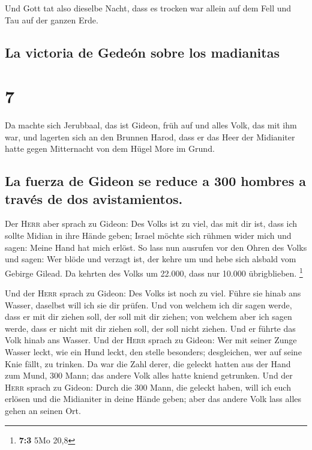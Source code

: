  Und Gott tat also dieselbe Nacht, dass es trocken war
allein auf dem Fell und Tau auf der ganzen Erde.

\hypertarget{la-victoria-de-gedeuxf3n-sobre-los-madianitas}{%
\subsection{La victoria de Gedeón sobre los
madianitas}\label{la-victoria-de-gedeuxf3n-sobre-los-madianitas}}

\hypertarget{section-6}{%
\section{7}\label{section-6}}

 Da machte sich Jerubbaal, das ist Gideon, früh auf und
alles Volk, das mit ihm war, und lagerten sich an den Brunnen Harod,
dass er das Heer der Midianiter hatte gegen Mitternacht von dem Hügel
More im Grund.

\hypertarget{la-fuerza-de-gideon-se-reduce-a-300-hombres-a-travuxe9s-de-dos-avistamientos.}{%
\subsection{La fuerza de Gideon se reduce a 300 hombres a través de dos
avistamientos.}\label{la-fuerza-de-gideon-se-reduce-a-300-hombres-a-travuxe9s-de-dos-avistamientos.}}

 Der \textsc{Herr} aber sprach zu Gideon: Des Volks ist zu
viel, das mit dir ist, dass ich sollte Midian in ihre Hände geben;
Israel möchte sich rühmen wider mich und sagen: Meine Hand hat mich
erlöst.  So lass nun ausrufen vor den Ohren des Volks und
sagen: Wer blöde und verzagt ist, der kehre um und hebe sich alsbald vom
Gebirge Gilead. Da kehrten des Volks um 22.000, dass nur 10.000
übrigblieben. \footnote{\textbf{7:3} 5Mo 20,8}

 Und der \textsc{Herr} sprach zu Gideon: Des Volks ist
noch zu viel. Führe sie hinab ans Wasser, daselbst will ich sie dir
prüfen. Und von welchem ich dir sagen werde, dass er mit dir ziehen
soll, der soll mit dir ziehen; von welchem aber ich sagen werde, dass er
nicht mit dir ziehen soll, der soll nicht ziehen.  Und er
führte das Volk hinab ans Wasser. Und der \textsc{Herr} sprach zu
Gideon: Wer mit seiner Zunge Wasser leckt, wie ein Hund leckt, den
stelle besonders; desgleichen, wer auf seine Knie fällt, zu trinken.
 Da war die Zahl derer, die geleckt hatten aus der Hand
zum Mund, 300 Mann; das andere Volk alles hatte kniend getrunken.
 Und der \textsc{Herr} sprach zu Gideon: Durch die 300
Mann, die geleckt haben, will ich euch erlösen und die Midianiter in
deine Hände geben; aber das andere Volk lass alles gehen an seinen Ort.

